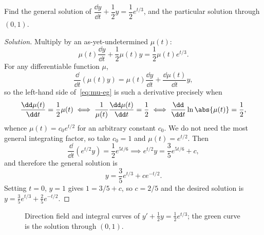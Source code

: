 \begin{eg}
	Find the general solution of
	\(\dfrac{\dd y}{\dd t} + \dfrac{1}{2} y = \dfrac{1}{2} e^{t/3}\), and the particular
	solution through \((0,1)\).
\end{eg}

\begin{proof}[Solution]
	Multiply by an as-yet-undetermined \(\mu(t)\):
	\begin{equation}\label{eq:mu-eg}
		\mu(t) \frac{\dd y}{\dd t} + \frac{1}{2}\mu(t) y
		= \frac{1}{2}\mu(t) e^{t/3}.
	\end{equation}
	For any differentiable function \(\mu\),
	\[
		\frac{\dd}{\dd t}\left( \mu(t) y \right)
		= \mu(t) \frac{\dd y}{\dd t} + \frac{\dd \mu(t)}{\dd t} y,
	\]
	so the left-hand side of~\eqref{eq:mu-eg} is such a derivative precisely when
	\[
		\frac{\dd \mu(t)}{\dd t} = \frac{1}{2} \mu(t)
		\iff \frac{1}{\mu(t)} \frac{\dd \mu(t)}{\dd t} = \frac{1}{2}
		\iff \frac{\dd}{\dd t} \ln\abs{\mu(t)} = \frac{1}{2},
	\]
	whence \(\mu(t) = c_0 e^{t/2}\) for an arbitrary constant \(c_0\). We do not need the
	most general integrating factor, so take \(c_0 = 1\) and \(\mu(t) = e^{t/2}\). Then
	\[
		\frac{\dd}{\dd t}\left( e^{t/2} y \right) = \frac{1}{2} e^{5t/6}
		\implies e^{t/2} y = \frac{3}{5} e^{5t/6} + c,
	\]
	and therefore the general solution is
	\[
		y = \frac{3}{5} e^{t/3} + c e^{-t/2}.
	\]
	Setting \(t = 0\), \(y = 1\) gives \(1 = 3/5 + c\), so \(c = 2/5\) and the desired
	solution is \(y = \frac{3}{5} e^{t/3} + \frac{2}{5} e^{-t/2}\).
\end{proof}

\begin{figure}[H]
	\centering
	\caption{Direction field and integral curves of
		\(y' + \frac12 y = \frac12 e^{t/3}\); the green curve is the solution through
		\((0,1)\).}
\end{figure}

